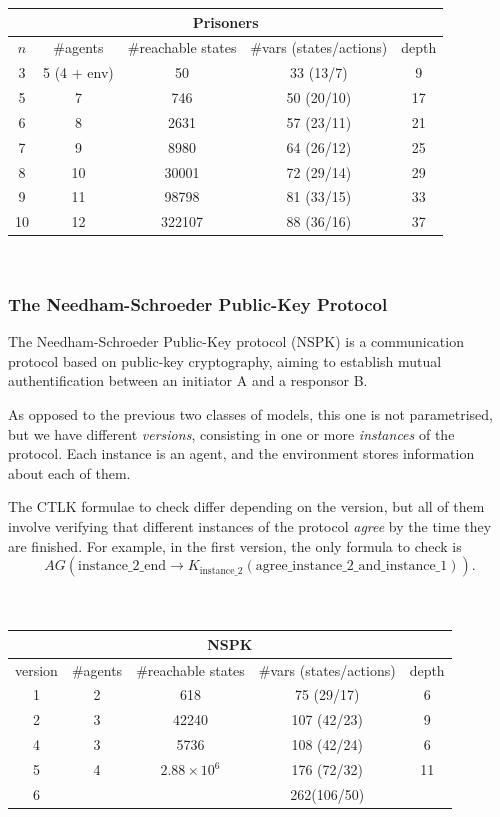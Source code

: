 \documentclass[11pt]{report}
\begin{document}
{\centering
\begin{tabular}{*{5}{c}}
\hline
\hline
\multicolumn{5}{c}{\textbf{Prisoners}}\\ \hline
$n$ & \#agents & \#reachable states & \#vars (states/actions) & depth \\\hline
3 & 5 (4 + env) & 50 & 33 (13/7) & 9 \\ \hline
5 & 7 & 746 & 50 (20/10) & 17 \\ \hline
6 & 8 & 2631 & 57 (23/11) & 21 \\ \hline
7 & 9 & 8980 & 64 (26/12) & 25 \\ \hline
8 & 10 & 30001 & 72 (29/14) & 29 \\ \hline
9 & 11 & 98798 & 81 (33/15) & 33 \\ \hline
10 & 12  & 322107 & 88 (36/16) & 37 \\ \hline
\end{tabular}
\\}
\subsubsection{The Needham-Schroeder Public-Key Protocol}

The Needham-Schroeder Public-Key protocol \cite{nspk} (NSPK) is a communication protocol based on public-key cryptography, aiming to establish mutual authentification between an initiator A and a responsor B.

As opposed to the previous two classes of models, this one is not parametrised, but we have different \textit{versions}, consisting in one or more \textit{instances} of the protocol. Each instance is an agent, and the environment stores information about each of them.

The CTLK formulae to check differ depending on the version, but all of them involve verifying that different instances of the protocol \textit{agree} by the time they are finished. For example, in the first version, the only formula to check is 
$$AG (\mbox{instance\_2\_end} \rightarrow K_{\mbox{instance\_2}}( \mbox{agree\_instance\_2\_and\_instance\_1})).$$
\\\\
{\centering
\begin{tabular}{*{5}{c}}
\hline
\hline
\multicolumn{5}{c}{\textbf{NSPK}}\\ \hline
version & \#agents & \#reachable states & \#vars (states/actions) & depth \\\hline
1 & 2 & 618 & 75 (29/17) & 6 \\ \hline
2 & 3 & 42240 & 107 (42/23) & 9 \\ \hline
4 & 3 & 5736 & 108 (42/24) & 6 \\ \hline
5 & 4 & $2.88\times10^6 $ & 176 (72/32) & 11 \\ \hline
6 &  & &  262(106/50) &  \\ \hline

\hline
\end{tabular}
\\}
\end{document}
